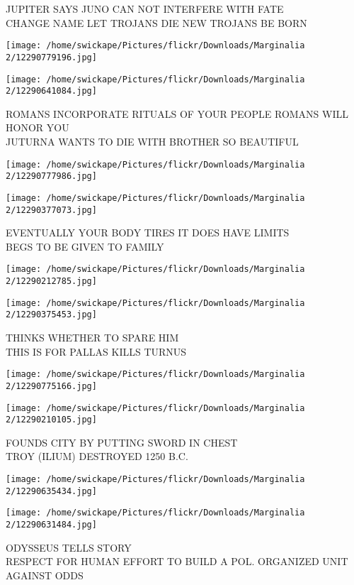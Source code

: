 \documentclass[10pt,letterpaper]{article}
\begin{document}
JUPITER SAYS JUNO CAN NOT INTERFERE WITH FATE\\
CHANGE NAME LET TROJANS DIE NEW TROJANS BE BORN
\pagebreak

\texttt{[image: /home/swickape/Pictures/flickr/Downloads/Marginalia 2/12290779196.jpg]}

\vspace{0.25in}
\texttt{[image: /home/swickape/Pictures/flickr/Downloads/Marginalia 2/12290641084.jpg]}

ROMANS INCORPORATE RITUALS OF YOUR PEOPLE ROMANS WILL HONOR YOU\\
JUTURNA WANTS TO DIE WITH BROTHER SO BEAUTIFUL
\pagebreak

\texttt{[image: /home/swickape/Pictures/flickr/Downloads/Marginalia 2/12290777986.jpg]}

\vspace{0.25in}
\texttt{[image: /home/swickape/Pictures/flickr/Downloads/Marginalia 2/12290377073.jpg]}

EVENTUALLY YOUR BODY TIRES IT DOES HAVE LIMITS\\
BEGS TO BE GIVEN TO FAMILY
\pagebreak

\texttt{[image: /home/swickape/Pictures/flickr/Downloads/Marginalia 2/12290212785.jpg]}

\vspace{0.25in}
\texttt{[image: /home/swickape/Pictures/flickr/Downloads/Marginalia 2/12290375453.jpg]}

THINKS WHETHER TO SPARE HIM\\
THIS IS FOR PALLAS KILLS TURNUS
\pagebreak

\texttt{[image: /home/swickape/Pictures/flickr/Downloads/Marginalia 2/12290775166.jpg]}

\vspace{0.25in}
\texttt{[image: /home/swickape/Pictures/flickr/Downloads/Marginalia 2/12290210105.jpg]}

FOUNDS CITY BY PUTTING SWORD IN CHEST\\
TROY (ILIUM) DESTROYED 1250 B.C.
\pagebreak

\texttt{[image: /home/swickape/Pictures/flickr/Downloads/Marginalia 2/12290635434.jpg]}

\vspace{0.25in}
\texttt{[image: /home/swickape/Pictures/flickr/Downloads/Marginalia 2/12290631484.jpg]}

ODYSSEUS TELLS STORY\\
RESPECT FOR HUMAN EFFORT TO BUILD A POL. ORGANIZED UNIT AGAINST ODDS
\pagebreak
\end{document}
